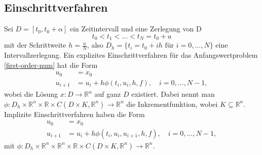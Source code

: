 \subsection{Einschrittverfahren}
\begin{definition}
    Sei $D=[t_0,t_0+\alpha]$ ein Zeitintervall und eine Zerlegung von D
    \[
        t_0 < t_1 < \dots < t_N = t_0 + a
    \]
    mit der Schrittweite $h=\frac{a}{N}$, also $D_h=\{t_i=t_0 + ih \text{ für } i=0, \dots,N\}$ eine Intervallzerlegung.
    Ein explizites Einschrittverfahren für das Anfangswertproblem \eqref{first-order-num} hat die Form
    \begin{align}
        u_0 &= x_0 \nonumber \\
        u_{i+1} &= u_i + h\phi(t_i,u_i,h,f), \quad i=0,\dots,N-1, \label{eq:6}
    \end{align}
    wobei die Lösung $x:D \rightarrow \mathbb{R}^{n}$ auf ganz $D$ existiert.
    Dabei nennt man
    $\phi:D_h \times \mathbb{R}^n \times \mathbb{R} \times C(D \times K,\mathbb{R}^n) \rightarrow \mathbb{R}^n$ die
    Inkrementfunktion, wobei $K \subseteq \mathbb{R}^n$.
    Implizite Einschrittverfahren haben die Form
    \begin{align*}
        u_0 &= x_0\\
        u_{i+1} &= u_i + h\phi(t_i,u_i,u_{i+1},h,f), \quad i=0,\dots,N-1,
    \end{align*}
    mit $\phi:D_h \times \mathbb{R}^n \times \mathbb{R}^n \times \mathbb{R} \times C(D \times K,\mathbb{R}^n)
    \rightarrow \mathbb{R}^n$.
\end{definition}
